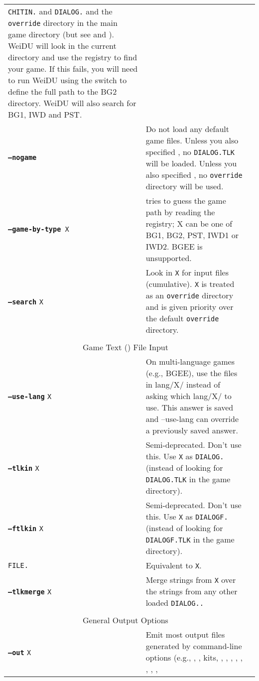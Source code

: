 \documentclass{article}
\def\ttref#1{\ahrefloc{#1}{\tt #1}}
\def\DEFINE#1{{\tt \bf #1}\label{#1}\index{#1}}
\def\t#1{{\tt #1}}
\begin{document}
\begin{tabular}{lp{10in}|p{10in}}
{\tt CHITIN.}\ttref{KEY} and {\tt DIALOG.}\ttref{TLK} and the \t{override}
directory in the main game directory (but see \ttref{--tlkin} and
\ttref{--search}). WeiDU will look in the current directory and use the
registry to find your game. If this fails, you will need to run WeiDU using
the \ttref{--game} switch to define the full path to the BG2 directory.
WeiDU will also search for BG1, IWD and PST. \\
\DEFINE{--nogame}  & Do not
load any default game files. Unless you also specified \ttref{--tlkin}, no
\t{DIALOG.TLK} will be loaded. Unless you also specified \ttref{--search},
no \t{override} directory will be used. \\
{\tt \DEFINE{--game-by-type} X} & tries to guess the game path by reading
the registry; X can be one of BG1, BG2, PST, IWD1 or IWD2. BGEE is unsupported.
\\
\DEFINE{--search} \t{X}	& Look in {\tt X} for input files (cumulative).
\t{X} is treated as an \t{override} directory and is given priority over
the default \t{override} directory. \\
\\
\multicolumn{2}{c}{ \color{red} Game Text (\ttref{TLK}) File Input} \\
\DEFINE{--use-lang} \t{X} & On multi-language games (e.g., BGEE), use the files
in lang/X/ instead of asking which lang/X/ to use. This answer is saved
and --use-lang can override a previously saved answer.\\
\DEFINE{--tlkin} \t{X}	& Semi-deprecated. Don't use this. Use {\tt X} as {\tt DIALOG.}\ttref{TLK} (instead
of looking for \t{DIALOG.TLK} in the game directory). \\
\DEFINE{--ftlkin} \t{X} & Semi-deprecated. Don't use this. Use {\tt X} as {\tt DIALOGF.}\ttref{TLK} (instead
of looking for \t{DIALOGF.TLK} in the game directory). \\
\tt{FILE.}\ttref{TLK} & Equivalent to \ttref{--tlkin} \t{X}. \\
\DEFINE{--tlkmerge} \t{X}	& Merge strings from {\tt X} over the strings from any other loaded {\tt \t{DIALOG.}\ttref{TLK}.} \\
\\
\multicolumn{2}{c}{ \color{red} General Output Options} \\
\DEFINE{--out} \t{X} &	Emit most output files generated by command-line
options (e.g., \ttref{D}, \ttref{DLG}, kits, \ttref{--biff-get},
\ttref{BAF}, \ttref{BCS}, \ttref{--automate}, \ttref{--traify-tlk},
\ttref{--extract-kits}, \ttref{--list-biff}, \ttref{--cmp-from},

\end{tabular}
\end{document}
